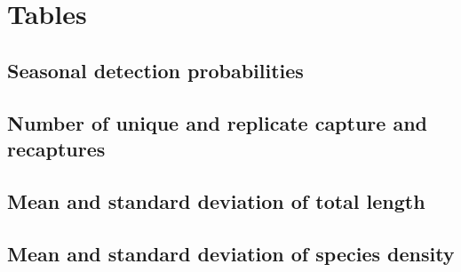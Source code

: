 \documentclass[11pt, class=article, crop=false]{standalone}
\begin{document}





\section{Tables}

\subsection*{Seasonal detection probabilities}



\newpage

\subsection*{Number of unique and replicate capture and recaptures}



\newpage

\subsection*{Mean and standard deviation of total length}



\newpage

\subsection*{Mean and standard deviation of species density}
\end{document}
